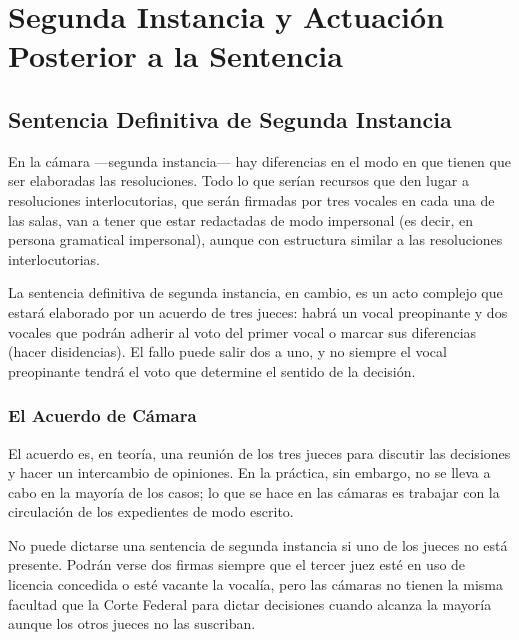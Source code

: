 \documentclass[12pt,oneside]{book}
\begin{document}

\chapter{Segunda Instancia y Actuación Posterior a la Sentencia}

\section{Sentencia Definitiva de Segunda Instancia}

En la cámara —segunda instancia— hay diferencias en el modo en que tienen que ser elaboradas las resoluciones. Todo lo que serían recursos que den lugar a resoluciones interlocutorias, que serán firmadas por tres vocales en cada una de las salas, van a tener que estar redactadas de modo impersonal (es decir, en persona gramatical impersonal), aunque con estructura similar a las resoluciones interlocutorias.

La sentencia definitiva de segunda instancia, en cambio, es un acto complejo que estará elaborado por un acuerdo de tres jueces: habrá un vocal preopinante y dos vocales que podrán adherir al voto del primer vocal o marcar sus diferencias (hacer disidencias). El fallo puede salir dos a uno, y no siempre el vocal preopinante tendrá el voto que determine el sentido de la decisión.

\subsection{El Acuerdo de Cámara}

El acuerdo es, en teoría, una reunión de los tres jueces para discutir las decisiones y hacer un intercambio de opiniones. En la práctica, sin embargo, no se lleva a cabo en la mayoría de los casos; lo que se hace en las cámaras es trabajar con la circulación de los expedientes de modo escrito.

\begin{important}
No puede dictarse una sentencia de segunda instancia si uno de los jueces no está presente. Podrán verse dos firmas siempre que el tercer juez esté en uso de licencia concedida o esté vacante la vocalía, pero las cámaras no tienen la misma facultad que la Corte Federal para dictar decisiones cuando alcanza la mayoría aunque los otros jueces no las suscriban.
\end{important}
\end{document}
